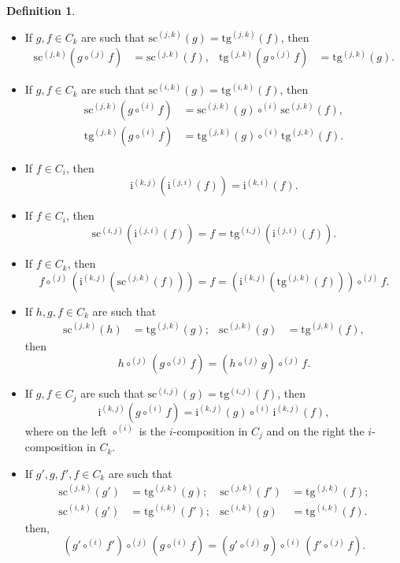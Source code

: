 \documentclass{amsart}
\theoremstyle{plain}
\theoremstyle{definition}
\newtheorem{definition}[theorem]{Definition}
\begin{document}
\begin{definition}
\begin{itemize}
\begin{align*}
\mathrm{tg}^{(i,j)}(\mathrm{tg}^{(j,k)}(f))&=\mathrm{tg}^{(i,k)}(f)=\mathrm{tg}^{(i,j)}(\mathrm{sc}^{(j,k)}(f)).
\end{align*}
\item[(MS2)] If $g,f\in C_{k}$ are such that $\mathrm{sc}^{(j,k)}(g)=\mathrm{tg}^{(j,k)}(f)$, then
\begin{align*}
\mathrm{sc}^{(j,k)}(g\circ^{(j)}f)&=\mathrm{sc}^{(j,k)}(f), &
\mathrm{tg}^{(j,k)}(g\circ^{(j)}f)&=\mathrm{tg}^{(j,k)}(g).
\end{align*}
\item[(MS3)] If $g,f\in C_{k}$ are such that $\mathrm{sc}^{(i,k)}(g)=\mathrm{tg}^{(i,k)}(f)$, then
\begin{align*}
\mathrm{sc}^{(j,k)}(g\circ^{(i)}f)&=\mathrm{sc}^{(j,k)}(g)\circ^{(i)}\mathrm{sc}^{(j,k)}(f),\\
\mathrm{tg}^{(j,k)}(g\circ^{(i)}f)&=\mathrm{tg}^{(j,k)}(g)\circ^{(i)}\mathrm{tg}^{(j,k)}(f).
\end{align*}
\item[(MS4)] If $f\in C_{i}$, then
$$
\mathrm{i}^{(k,j)}(\mathrm{i}^{(j,i)}(f))=\mathrm{i}^{(k,i)}(f).
$$
\item[(MS5)] If $f\in C_{i}$, then
$$
\mathrm{sc}^{(i,j)}(\mathrm{i}^{(j,i)}(f))=f=
\mathrm{tg}^{(i,j)}(\mathrm{i}^{(j,i)}(f)).
$$
\item[(MS6)] If $f\in C_{k}$, then
$$
f\circ^{(j)}
(\mathrm{i}^{(k,j)}(\mathrm{sc}^{(j,k)}(f)))
=
f
=
(\mathrm{i}^{(k,j)}(\mathrm{tg}^{(j,k)}(f)))
\circ^{(j)}
f.
$$
\item[(MS7)] If $h,g,f\in C_{k}$ are such that 
\begin{align*}
\mathrm{sc}^{(j,k)}(h)&=\mathrm{tg}^{(j,k)}(g); &
\mathrm{sc}^{(j,k)}(g)&=\mathrm{tg}^{(j,k)}(f),
\end{align*}
then
$$
h\circ^{(j)}(g\circ^{(j)}f)=
(h\circ^{(j)}g)\circ^{(j)}f.
$$
\item[(MS8)] If $g,f\in C_{j}$ are such that $\mathrm{sc}^{(i,j)}(g)=\mathrm{tg}^{(i,j)}(f)$, then
$$
\mathrm{i}^{(k,j)}(g\circ^{(i)}f)=\mathrm{i}^{(k,j)}(g)\circ^{(i)}\mathrm{i}^{(k,j)}(f),
$$
where on the left $\circ^{(i)}$ is the $i$-composition in $C_{j}$ and on the right the $i$-composition in $C_{k}$.
\item[(MS9)] If $g',g,f',f\in C_{k}$ are such that
\begin{align*}
\mathrm{sc}^{(j,k)}(g')&=\mathrm{tg}^{(j,k)}(g); &
\mathrm{sc}^{(j,k)}(f')&=\mathrm{tg}^{(j,k)}(f);\\
\mathrm{sc}^{(i,k)}(g')&=\mathrm{tg}^{(i,k)}(f'); &
\mathrm{sc}^{(i,k)}(g)&=\mathrm{tg}^{(i,k)}(f).
\end{align*}
then,
$$
(g'\circ^{(i)}f')\circ^{(j)}(g\circ^{(i)} f)
=
(g'\circ^{(j)}g)\circ^{(i)}(f'\circ^{(j)}f)
.
$$
\end{itemize}


\end{definition}
\end{document}
